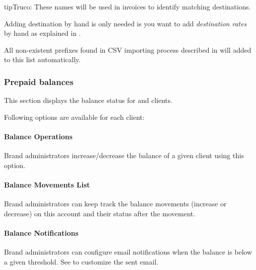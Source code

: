 \documentclass[letterpaper,10pt,spanish]{sphinxmanual}
\begin{document}
\begin{notice}{tip}{Truco:}
These names will be used in invoices to identify matching destinations.
\end{notice}

Adding destination by hand is only needed is you want to add \emph{destination rates} by hand as explained in {\hyperref[administration_portal/brand/billing/destination_rates:add\string-rates\string-manually]{}}.

All non-existent prefixes found in CSV importing process described in {\hyperref[administration_portal/brand/billing/destination_rates:importing\string-a\string-csv\string-file]{}} will added to this list
automatically.


\subsubsection{Prepaid balances}
\label{administration_portal/brand/billing/prepaid_balances::doc}\label{administration_portal/brand/billing/prepaid_balances:prepaid-balances}
This section displays the balance status for {\hyperref[administration_portal/brand/billing/index:prepaid\string-billing]{}} and {\hyperref[administration_portal/brand/billing/index:pseudo\string-prepaid\string-billing]{}} clients.

Following options are available for each client:


\paragraph{Balance Operations}
\label{administration_portal/brand/billing/prepaid_balances:balance-operations}
Brand administrators increase/decrease the balance of a given client using this option.


\paragraph{Balance Movements List}
\label{administration_portal/brand/billing/prepaid_balances:balance-movements-list}
Brand administrators can keep track the balance movements (increase or decrease) on this account and their status
after the movement.


\paragraph{Balance Notifications}
\label{administration_portal/brand/billing/prepaid_balances:balance-notifications}
Brand administrators can configure email notifications when the balance is below a given threshold. See
{\hyperref[administration_portal/brand/settings/notification_templates:notification\string-templates]{}} to customize the sent email.
\end{document}
